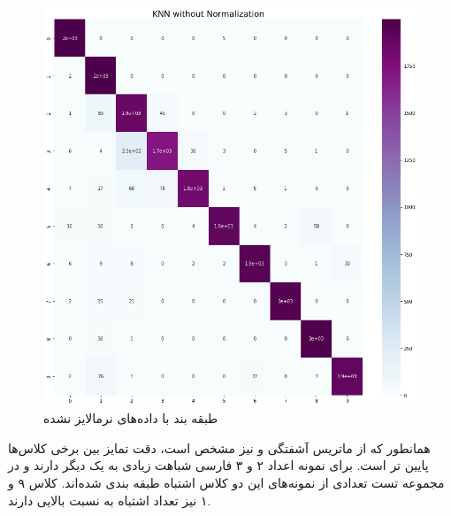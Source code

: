 \documentclass[12pt,onecolumn,a4paper]{article}
\begin{document}
\begin{figure}[h!]
    \begin{center}
    \includegraphics[scale=0.5]{q7/Q7_b1.png}
    \caption{ طبقه بند  با داده‌های نرمالایز نشده}
    \label{fig:2}
    \end{center}
\end{figure}
همانطور که از ماتریس آشفتگی و  نیز مشخص است، دقت تمایز بین برخی کلاس‌ها پایین تر است. برای نمونه اعداد ۲ و ۳ فارسی شباهت زیادی به یک دیگر دارند و در مجموعه تست تعدادی از نمونه‌های این دو کلاس اشتباه طبقه بندی شده‌اند. کلاس ۹ و ۱ نیز تعداد اشتباه به نسبت بالایی دارند.
\end{document}
